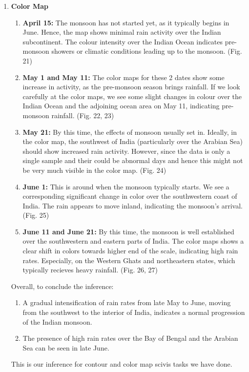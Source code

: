 \documentclass[conference]{IEEEtran}
\begin{document}
\begin{enumerate}
    
\item \textbf{Color Map} 


\begin{enumerate}
\item \textbf{April 15:} The monsoon has not started yet, as it typically begins in June. Hence, the map shows minimal rain activity over the Indian subcontinent. The colour intensity over the Indian Ocean indicates pre-monsoon showers or climatic conditions leading up to the monsoon. (Fig. 21)

\item \textbf{May 1 and May 11:} The color maps for these 2 dates show some increase in activity, as the pre-monsoon season brings rainfall. If we look carefully at the color maps, we see some slight changes in colour over the Indian Ocean and the adjoining ocean area on May 11, indicating pre-monsoon rainfall. (Fig. 22, 23)

\item \textbf{May 21:} By this time, the effects of monsoon usually set in. Ideally, in the color map, the southwest of India (particularly over the Arabian Sea) should show increased rain activity. However, since the data is only a single sample and their could be abnormal days and hence this might not be very much visible in the color map. (Fig. 24)

\item \textbf{June 1:} This is around when the monsoon typically starts. We see a corresponding significant change in color over the southwestern coast of India. The rain appears to move inland, indicating the monsoon's arrival. (Fig. 25)

\item \textbf{June 11 and June 21:} By this time, the monsoon is well established over the southwestern and eastern parts of India. The color maps shows a clear shift in colors towards higher end of the scale, indicating high rain rates. Especially, on the Western Ghats and northeastern states, which typically recieves heavy rainfall. (Fig. 26, 27)
\end{enumerate}

Overall, to conclude the inference:
\begin{enumerate}
 \item A gradual intensification of rain rates from late May to June, moving from the southwest to the interior of India, indicates a normal progression of the Indian monsoon.
 \item The presence of high rain rates over the Bay of Bengal and the Arabian Sea can be seen in late June.

 \end{enumerate}
 
 This is our inference for contour and color map scivis tasks we have done.
\end{enumerate}
\end{document}

